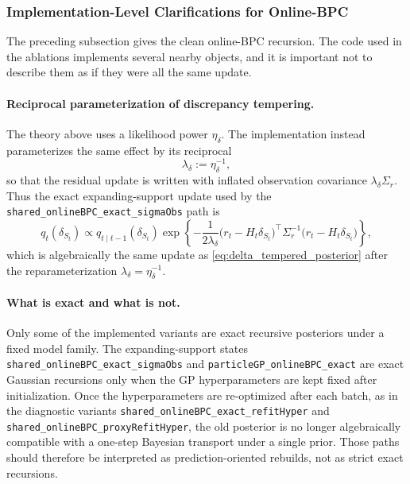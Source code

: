 \documentclass{article}
\begin{document}
\subsubsection{Implementation-Level Clarifications for Online-BPC}
\label{sec:online_bpc_impl_clarifications}

The preceding subsection gives the clean online-BPC recursion. The code used in the ablations implements several nearby objects, and it is important not to describe them as if they were all the same update.

\paragraph{Reciprocal parameterization of discrepancy tempering.}
The theory above uses a likelihood power $\eta_\delta$. The implementation instead parameterizes the same effect by its reciprocal
\begin{equation}
\lambda_\delta := \eta_\delta^{-1},
\end{equation}
so that the residual update is written with inflated observation covariance $\lambda_\delta \Sigma_r$. Thus the exact expanding-support update used by the \texttt{shared\_onlineBPC\_exact\_sigmaObs} path is
\begin{equation}
q_t(\delta_{S_t})
\propto
q_{t\mid t-1}(\delta_{S_t})
\exp\!\left\{
-\frac{1}{2\lambda_\delta}
\big(r_t-H_t\delta_{S_t}\big)^\top
\Sigma_r^{-1}
\big(r_t-H_t\delta_{S_t}\big)
\right\},
\label{eq:delta_exact_lambda_form}
\end{equation}
which is algebraically the same update as \eqref{eq:delta_tempered_posterior} after the reparameterization $\lambda_\delta=\eta_\delta^{-1}$.

\paragraph{What is exact and what is not.}
Only some of the implemented variants are exact recursive posteriors under a fixed model family. The expanding-support states \texttt{shared\_onlineBPC\_exact\_sigmaObs} and \texttt{particleGP\_onlineBPC\_exact} are exact Gaussian recursions only when the GP hyperparameters are kept fixed after initialization. Once the hyperparameters are re-optimized after each batch, as in the diagnostic variants \texttt{shared\_onlineBPC\_exact\_refitHyper} and \texttt{shared\_onlineBPC\_proxyRefitHyper}, the old posterior is no longer algebraically compatible with a one-step Bayesian transport under a single prior. Those paths should therefore be interpreted as prediction-oriented rebuilds, not as strict exact recursions.
\end{document}
